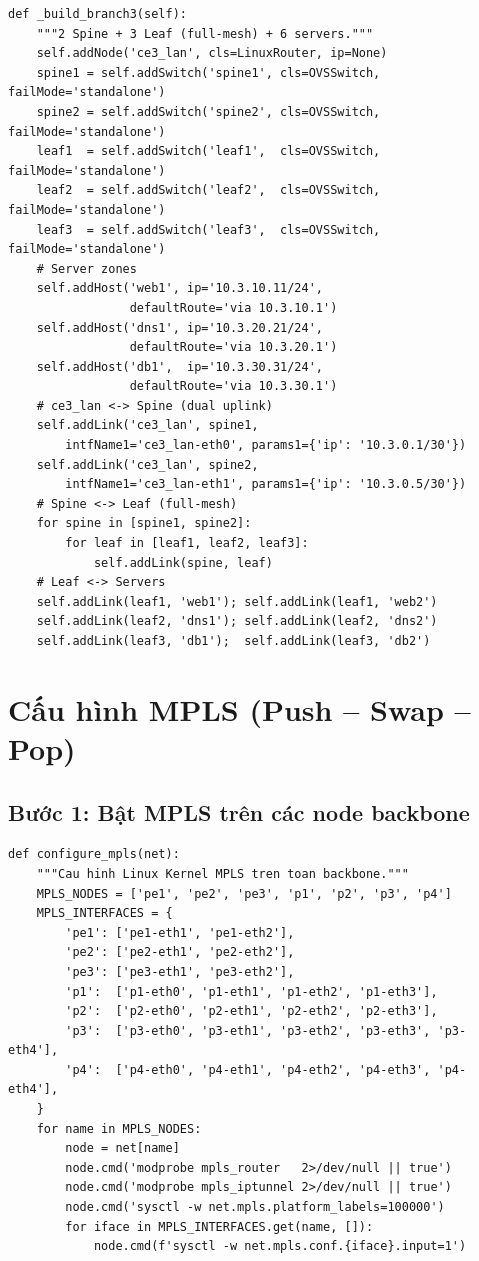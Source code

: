 \begin{lstlisting}[style=pythonstyle, caption={Hàm \_build\_branch3() -- Leaf-Spine (2-tier)}]
def _build_branch3(self):
    """2 Spine + 3 Leaf (full-mesh) + 6 servers."""
    self.addNode('ce3_lan', cls=LinuxRouter, ip=None)
    spine1 = self.addSwitch('spine1', cls=OVSSwitch, failMode='standalone')
    spine2 = self.addSwitch('spine2', cls=OVSSwitch, failMode='standalone')
    leaf1  = self.addSwitch('leaf1',  cls=OVSSwitch, failMode='standalone')
    leaf2  = self.addSwitch('leaf2',  cls=OVSSwitch, failMode='standalone')
    leaf3  = self.addSwitch('leaf3',  cls=OVSSwitch, failMode='standalone')
    # Server zones
    self.addHost('web1', ip='10.3.10.11/24',
                 defaultRoute='via 10.3.10.1')
    self.addHost('dns1', ip='10.3.20.21/24',
                 defaultRoute='via 10.3.20.1')
    self.addHost('db1',  ip='10.3.30.31/24',
                 defaultRoute='via 10.3.30.1')
    # ce3_lan <-> Spine (dual uplink)
    self.addLink('ce3_lan', spine1,
        intfName1='ce3_lan-eth0', params1={'ip': '10.3.0.1/30'})
    self.addLink('ce3_lan', spine2,
        intfName1='ce3_lan-eth1', params1={'ip': '10.3.0.5/30'})
    # Spine <-> Leaf (full-mesh)
    for spine in [spine1, spine2]:
        for leaf in [leaf1, leaf2, leaf3]:
            self.addLink(spine, leaf)
    # Leaf <-> Servers
    self.addLink(leaf1, 'web1'); self.addLink(leaf1, 'web2')
    self.addLink(leaf2, 'dns1'); self.addLink(leaf2, 'dns2')
    self.addLink(leaf3, 'db1');  self.addLink(leaf3, 'db2')
\end{lstlisting}

\section{Cấu hình MPLS (Push -- Swap -- Pop)}

\subsection{Bước 1: Bật MPLS trên các node backbone}

\begin{lstlisting}[style=pythonstyle, caption={Hàm khởi tạo MPLS trên từng node}]
def configure_mpls(net):
    """Cau hinh Linux Kernel MPLS tren toan backbone."""
    MPLS_NODES = ['pe1', 'pe2', 'pe3', 'p1', 'p2', 'p3', 'p4']
    MPLS_INTERFACES = {
        'pe1': ['pe1-eth1', 'pe1-eth2'],
        'pe2': ['pe2-eth1', 'pe2-eth2'],
        'pe3': ['pe3-eth1', 'pe3-eth2'],
        'p1':  ['p1-eth0', 'p1-eth1', 'p1-eth2', 'p1-eth3'],
        'p2':  ['p2-eth0', 'p2-eth1', 'p2-eth2', 'p2-eth3'],
        'p3':  ['p3-eth0', 'p3-eth1', 'p3-eth2', 'p3-eth3', 'p3-eth4'],
        'p4':  ['p4-eth0', 'p4-eth1', 'p4-eth2', 'p4-eth3', 'p4-eth4'],
    }
    for name in MPLS_NODES:
        node = net[name]
        node.cmd('modprobe mpls_router   2>/dev/null || true')
        node.cmd('modprobe mpls_iptunnel 2>/dev/null || true')
        node.cmd('sysctl -w net.mpls.platform_labels=100000')
        for iface in MPLS_INTERFACES.get(name, []):
            node.cmd(f'sysctl -w net.mpls.conf.{iface}.input=1')
\end{lstlisting}

